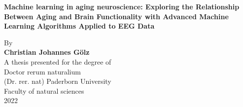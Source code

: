 \begin{titlepage}
    \begin{center}
        \vspace*{1cm}
        \Huge
        \textbf{Machine learning in aging neuroscience: Exploring the Relationship Between Aging and Brain Functionality with Advanced Machine Learning Algorithms Applied to EEG Data}
                        
        \vspace{1.5cm}
        \LARGE
        By\\
        \vspace{0.5cm}
        \textbf{Christian Johannes Gölz\\}
        \vspace{0.5cm}       
        A thesis presented for the degree of\\
        Doctor rerum naturalium\\
        (Dr. rer. nat)
        \vfill
        \Large
        Paderborn University\\
        Faculty of natural sciences\\
        2022
            
    \end{center}
\end{titlepage}

